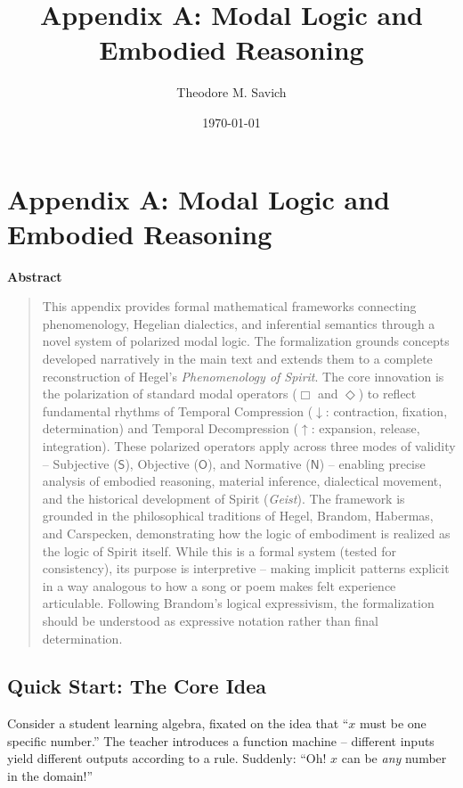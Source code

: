 \documentclass[12pt]{book}
\title{Appendix A: Modal Logic and Embodied Reasoning}
\author{Theodore M. Savich}
\date{\today}
\newenvironment{abstract}
    {
      \begin{center}
        \textbf{Abstract}
      \end{center}
      \vspace{\baselineskip}
      \begin{quotation}
      \small
    }
    {
      \end{quotation}
      \bigskip
    }
\begin{document}
\maketitle

\chapter{Appendix A: Modal Logic and Embodied Reasoning}

\begin{abstract}
This appendix provides formal mathematical frameworks connecting phenomenology, Hegelian dialectics, and inferential semantics through a novel system of polarized modal logic. The formalization grounds concepts developed narratively in the main text and extends them to a complete reconstruction of Hegel's \emph{Phenomenology of Spirit}. The core innovation is the polarization of standard modal operators ($\Box$ and $\Diamond$) to reflect fundamental rhythms of Temporal Compression ($\downarrow$: contraction, fixation, determination) and Temporal Decompression ($\uparrow$: expansion, release, integration). These polarized operators apply across three modes of validity -- Subjective ($\mathsf{S}$), Objective ($\mathsf{O}$), and Normative ($\mathsf{N}$) -- enabling precise analysis of embodied reasoning, material inference, dialectical movement, and the historical development of Spirit (\emph{Geist}). The framework is grounded in the philosophical traditions of Hegel, Brandom, Habermas, and Carspecken, demonstrating how the logic of embodiment is realized as the logic of Spirit itself. While this is a formal system (tested for consistency), its purpose is interpretive -- making implicit patterns explicit in a way analogous to how a song or poem makes felt experience articulable. Following Brandom's logical expressivism, the formalization should be understood as expressive notation rather than final determination.
\end{abstract}

\section*{Quick Start: The Core Idea}

Consider a student learning algebra, fixated on the idea that ``$x$ must be one specific number.'' The teacher introduces a function machine -- different inputs yield different outputs according to a rule. Suddenly: ``Oh! $x$ can be \textit{any} number in the domain!''
\end{document}
